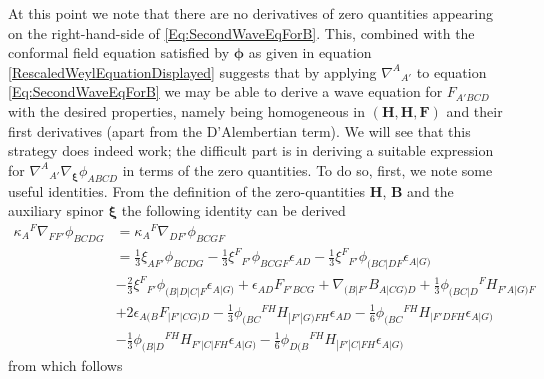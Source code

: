 \documentclass[10pt,a4paper]{article}
\theoremstyle{plain}
\def\bmB{{\bm B}}
\def\bmF{{\bm F}}
\def\bmH{{\bm H}}
\begin{document}
At this point we note that there are no derivatives of zero quantities
appearing on the right-hand-side of \eqref{Eq:SecondWaveEqForB}. This,
combined with the conformal field equation satisfied by
$\bm\phi$ as given in equation \eqref{RescaledWeylEquationDisplayed}
suggests
that by applying $\nabla^A{}_{A'}$ to equation
\eqref{Eq:SecondWaveEqForB} we may be able to derive a wave equation
for $F_{A'BCD}$ with the desired properties, namely being homogeneous
in $(\bmH, \bmH, \bmF)$ and their first derivatives (apart from the
D'Alembertian term). We will see that this strategy does indeed work;
the difficult part is in deriving a suitable expression for
$\nabla^A{}_{A'}\nabla_{\bm\xi}\phi_{ABCD}$ in terms of the zero
quantities.
To do so, first, we note some useful identities.  From the definition
of the zero-quantities $\bmH$, $\bmB$ and the auxiliary spinor
$\bm\xi$ the following identity can be derived
\begin{align}
    \kappa_{A}{}^{F} \nabla_{FF'}\phi_{BCDG} &=\kappa_{A}{}^{F}
    \nabla_{DF'}\phi_{BCGF} \nonumber\\ &= \tfrac{1}{3} \xi_{AF'}
    \phi_{BCDG} - \tfrac{1}{3} \xi^{F}{}_{F'} \phi_{BCGF}
    \epsilon_{AD} - \tfrac{1}{3}
    \xi^{F}{}_{F'}\phi_{(BC|DF}\epsilon_{A|G)} \nonumber \\ & -
    \tfrac{2}{3} \xi^{F}{}_{F'}\phi_{(B|D|C|F}\epsilon_{A|G)} +
    \epsilon_{AD} F_{F'BCG} + \nabla_{(B|F'}B_{A|CG)D} + \tfrac{1}{3}
    \phi_{(BC|D}{}^{F}H_{F'A|G)F} \nonumber \\& + 2
    \epsilon_{A(B}F_{|F'\vert CG)D} - \tfrac{1}{3}
    \phi_{(BC}{}^{FH}H_{|F'|G)FH}\epsilon_{AD} - \tfrac{1}{6}
    \phi_{(BC}{}^{FH}H_{|F'DFH}\epsilon_{A|G)} \nonumber\\ & -
    \tfrac{1}{3} \phi_{(B|D}{}^{FH}H_{F'|C|FH}\epsilon_{A|G)} -
    \tfrac{1}{6}
    \phi_{D(B}{}^{FH}H_{|F'|C|FH}\epsilon_{A|G)}\label{Eq:MiscIdentity2}
\end{align}
from which follows 
\end{document}
